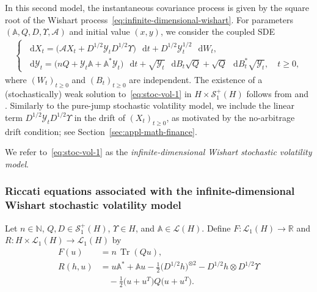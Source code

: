 \documentclass[10pt,a4paper,reqno]{amsart}
\newcommand*\D{\mathop{}\!\mathrm{d}}
\DeclareMathOperator{\tr}{Tr}
\numberwithin{equation}{section}
\theoremstyle{plain}
\theoremstyle{definition}
\theoremstyle{example}
\newcommand{\cA}{\mathcal{A}}
\newcommand{\cL}{\mathcal{L}}
\newcommand{\cY}{\mathcal{Y}}
\newcommand{\cS}{\mathcal{S}}
\begin{document}
In this second model, the instantaneous covariance process is given by the square root of the Wishart process~\eqref{eq:infinite-dimensional-wishart}.  
For parameters $(\mathbb{A}, Q, D, \Upsilon, \cA)$ and initial value $(x, y)$, we consider the coupled SDE
\begin{align}\label{eq:stoc-vol-1}
\begin{cases}
\D X_{t} = \big( \cA X_{t} + D^{1/2} \cY_t D^{1/2} \Upsilon \big) \,\D t
           + D^{1/2} \cY_t^{1/2} \,\D W_{t}, \\[4pt]
\D \cY_t = \big( n Q + \cY_t \mathbb{A}+ \mathbb{A}^* \cY_t \big) \,\D t
           + \sqrt{\cY_t} \,\D B_t \sqrt{Q}
           + \sqrt{Q} \,\D B_t^* \sqrt{\cY_t}, 
           \quad t \geq 0 ,
\end{cases}
\end{align}
where $(W_t)_{t \geq 0}$ and $(B_t)_{t \geq 0}$ are independent.  
The existence of a (stochastically) weak solution to~\eqref{eq:stoc-vol-1} in $H \times \cS_1^+(H)$ follows from \cite[Lemma~2.8]{CKK22b} and \cite[Theorem~2.1]{cox2024infinite}. Similarly to the pure-jump stochastic volatility model, we include the linear term $D^{1/2}\cY_t D^{1/2}\Upsilon$ in the drift of $(X_t)_{t\geq0}$, as motivated by the no-arbitrage drift condition; see Section~\ref{sec:appl-math-finance}.

We refer to~\eqref{eq:stoc-vol-1} as the \emph{infinite-dimensional Wishart stochastic volatility model}.


\subsubsection{Riccati equations associated with the infinite-dimensional Wishart stochastic volatility model} 

Let $n \in \mathbb{N}$, $Q, D \in \cS_1^+(H)$, $\Upsilon \in H$, and $\mathbb{A} \in \cL(H)$.  
Define $F \colon \cL_1(H) \to \mathbb{R}$ and $R \colon H \times \cL_1(H) \to \cL_1(H)$ by
\begin{align}
F(u) &= n \, \tr(Q u), \label{eq:F-Wishart}\\
R(h,u) &= u \mathbb{A}^* + \mathbb{A} u - \tfrac{1}{2} \big(D^{1/2} h\big)^{\otimes 2}
          - D^{1/2} h \otimes D^{1/2} \Upsilon \nonumber \\
       &\quad - \tfrac{1}{2} \big(u + u^T \big) Q \big(u + u^T \big). \label{eq:R-Wishart}
\end{align}
\end{document}
